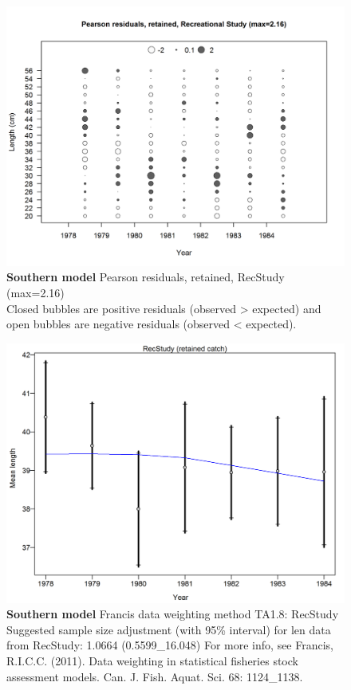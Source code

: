 \documentclass[12pt,]{article}
\begin{document}
\begin{figure}[htbp]
\centering
\includegraphics{./r4ss/plots_mod2/comp_lenfit_residsflt5mkt2.png}
\caption{\textbf{Southern model} Pearson residuals, retained, RecStudy
(max=2.16)\\
Closed bubbles are positive residuals (observed \textgreater{} expected)
and open bubbles are negative residuals (observed \textless{} expected).
\label{fig:mod2_18_comp_lenfit_residsflt5mkt2}}
\end{figure}

\begin{figure}[htbp]
\centering
\includegraphics{./r4ss/plots_mod2/comp_lenfit_data_weighting_TA1.8_RecStudy.png}
\caption{\textbf{Southern model} Francis data weighting method TA1.8:
RecStudy Suggested sample size adjustment (with 95\% interval) for len
data from RecStudy: 1.0664 (0.5599\_16.048) For more info, see Francis,
R.I.C.C. (2011). Data weighting in statistical fisheries stock
assessment models. Can. J. Fish. Aquat. Sci. 68: 1124\_1138.
\label{fig:mod2_20_comp_lenfit_data_weighting_TA1.8_RecStudy}}
\end{figure}
\end{document}
